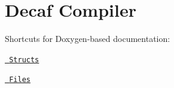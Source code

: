 \chapter{Decaf Compiler}
\hypertarget{index}{}\label{index}
Shortcuts for Doxygen-\/based documentation\+:
\begin{DoxyItemize}
\item \href{annotated.html}{\texttt{ Structs}}
\item \href{files.html}{\texttt{ Files}} 
\end{DoxyItemize}